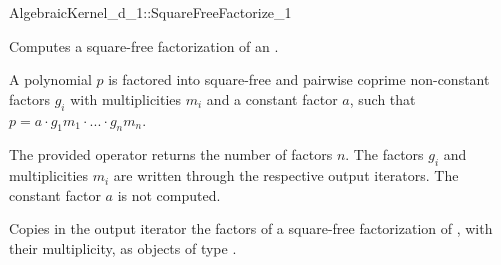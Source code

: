 \begin{ccRefConcept}{AlgebraicKernel_d_1::SquareFreeFactorize_1}

\ccDefinition
Computes a square-free factorization of an
.

A polynomial $p$ is factored into square-free and pairwise 
coprime non-constant factors $g_i$ with multiplicities $m_i$ 
and a constant factor $a$, such that 
$p = a  \cdot  g_1m_1  \cdot  ...  \cdot  g_nm_n$.

The provided operator returns the number of factors $n$.
The factors $g_i$ and multiplicities $m_i$ are written through the 
respective output iterators. 
The constant factor $a$ is not computed. 

\ccRefines 
{} 

\ccTypes
{}
\ccGlue
{}

\ccOperations
{}

{Copies in the output iterator the factors of a square-free 
factorization of , with their multiplicity, as objects of type 
.}

\ccSeeAlso
{}\\
\\

\end{ccRefConcept}
